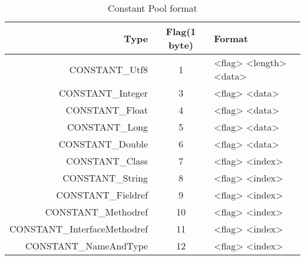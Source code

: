 ﻿\begin{table}
\centering
\begin{tabular}{r|c|l}
Type & Flag\newline(1 byte) & Format \\
\hline\hline
CONSTANT\_Utf8 & 1 & <flag> <length> <data>\\
CONSTANT\_Integer & 3 & <flag> <data>\\
CONSTANT\_Float & 4 & <flag> <data>\\
CONSTANT\_Long & 5 & <flag> <data>\\
CONSTANT\_Double & 6 & <flag> <data>\\
CONSTANT\_Class & 7 & <flag> <index>\\
CONSTANT\_String & 8 & <flag> <index>\\
CONSTANT\_Fieldref & 9 & <flag> <index>\\
CONSTANT\_Methodref & 10 & <flag> <index>\\
CONSTANT\_InterfaceMethodref & 11 & <flag> <index>\\
CONSTANT\_NameAndType & 12 & <flag> <index>\\
\hline
\end{tabular}
\caption{Constant Pool format}\label{tab:constantpooltype}
\end{table}